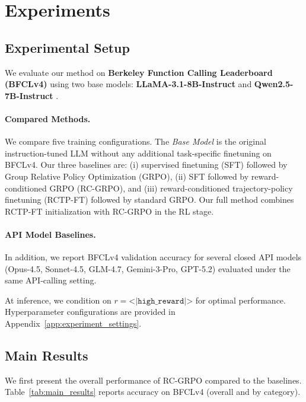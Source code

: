 \documentclass{article}
\newcommand{\SL}[1]{{\textcolor{red}{SL: #1}}}
\theoremstyle{plain}
\theoremstyle{definition}
\theoremstyle{remark}
\begin{document}
\section{Experiments}
\label{sec:experiments}

\subsection{Experimental Setup}
We evaluate our method on \textbf{Berkeley Function Calling Leaderboard (BFCLv4)} \cite{bfcl2024} using two base models: \textbf{LLaMA-3.1-8B-Instruct} \cite{dubey2024llama3} and \textbf{Qwen2.5-7B-Instruct} \cite{yang2024qwen2}.

\paragraph{Compared Methods.}
We compare five training configurations. The \emph{Base Model} is the original instruction-tuned LLM without any additional task-specific finetuning on BFCLv4. Our three baselines are: (i) supervised finetuning (SFT) followed by Group Relative Policy Optimization (GRPO), (ii) SFT followed by reward-conditioned GRPO (RC-GRPO), and (iii) reward-conditioned trajectory-policy finetuning (RCTP-FT) followed by standard GRPO. Our full method combines RCTP-FT initialization with RC-GRPO in the RL stage.

\paragraph{API Model Baselines.}
In addition, we report BFCLv4 validation accuracy for several closed API models (Opus-4.5, Sonnet-4.5, GLM-4.7, Gemini-3-Pro, GPT-5.2) evaluated under the same API-calling setting.

At inference, we condition on $r = \texttt{<|high\_reward|>}$ for optimal performance. Hyperparameter configurations are provided in Appendix~\ref{app:experiment_settings}.


\subsection{Main Results}
We first present the overall performance of RC-GRPO compared to the baselines. Table~\ref{tab:main_results} reports accuracy on BFCLv4 (overall and by category).
\end{document}
